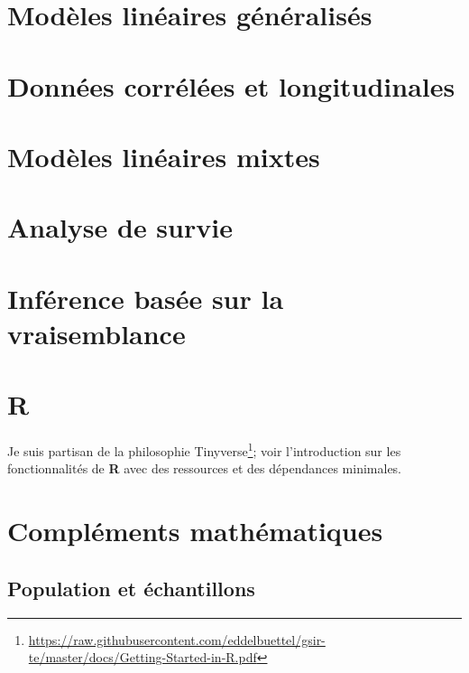 \documentclass[
  11pt,
  letterpaper,
]{book}
\renewcommand{\href}[2]{#2\footnote{\url{#1}}}
\theoremstyle{definition}
\theoremstyle{definition}
\theoremstyle{definition}
\theoremstyle{remark}
\begin{document}
\hypertarget{modeles-lineaires-generalises}{%
\chapter{Modèles linéaires généralisés}\label{modeles-lineaires-generalises}}

\hypertarget{donnees-correlees-longitudinales}{%
\chapter{Données corrélées et longitudinales}\label{donnees-correlees-longitudinales}}

\hypertarget{modeles-lineaires-mixtes}{%
\chapter{Modèles linéaires mixtes}\label{modeles-lineaires-mixtes}}

\hypertarget{survie}{%
\chapter{Analyse de survie}\label{survie}}

\hypertarget{vraisemblance}{%
\chapter{Inférence basée sur la vraisemblance}\label{vraisemblance}}

\hypertarget{appendix-annexe}{%
\appendix}


\hypertarget{r}{%
\chapter*{\texorpdfstring{\textbf{R}}{R}}\label{r}}

Je suis partisan de la \href{https://raw.githubusercontent.com/eddelbuettel/gsir-te/master/docs/Getting-Started-in-R.pdf}{philosophie Tinyverse}; voir l'introduction sur les fonctionnalités de \textbf{R} avec des ressources et des dépendances minimales.

\hypertarget{complement}{%
\chapter{Compléments mathématiques}\label{complement}}

\hypertarget{population-echantillon}{%
\section{Population et échantillons}\label{population-echantillon}}
\end{document}
